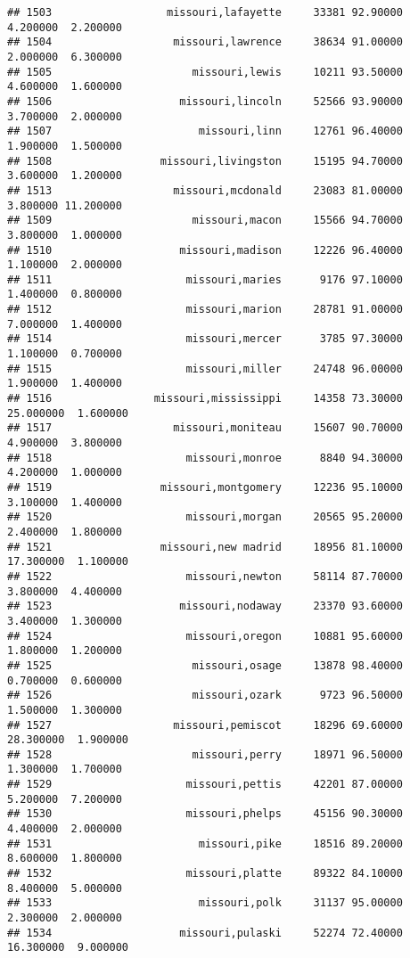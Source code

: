 \documentclass[
]{article}
\begin{document}
\begin{verbatim}
## 1503                  missouri,lafayette     33381 92.90000  4.200000  2.200000
## 1504                   missouri,lawrence     38634 91.00000  2.000000  6.300000
## 1505                      missouri,lewis     10211 93.50000  4.600000  1.600000
## 1506                    missouri,lincoln     52566 93.90000  3.700000  2.000000
## 1507                       missouri,linn     12761 96.40000  1.900000  1.500000
## 1508                 missouri,livingston     15195 94.70000  3.600000  1.200000
## 1513                   missouri,mcdonald     23083 81.00000  3.800000 11.200000
## 1509                      missouri,macon     15566 94.70000  3.800000  1.000000
## 1510                    missouri,madison     12226 96.40000  1.100000  2.000000
## 1511                     missouri,maries      9176 97.10000  1.400000  0.800000
## 1512                     missouri,marion     28781 91.00000  7.000000  1.400000
## 1514                     missouri,mercer      3785 97.30000  1.100000  0.700000
## 1515                     missouri,miller     24748 96.00000  1.900000  1.400000
## 1516                missouri,mississippi     14358 73.30000 25.000000  1.600000
## 1517                   missouri,moniteau     15607 90.70000  4.900000  3.800000
## 1518                     missouri,monroe      8840 94.30000  4.200000  1.000000
## 1519                 missouri,montgomery     12236 95.10000  3.100000  1.400000
## 1520                     missouri,morgan     20565 95.20000  2.400000  1.800000
## 1521                 missouri,new madrid     18956 81.10000 17.300000  1.100000
## 1522                     missouri,newton     58114 87.70000  3.800000  4.400000
## 1523                    missouri,nodaway     23370 93.60000  3.400000  1.300000
## 1524                     missouri,oregon     10881 95.60000  1.800000  1.200000
## 1525                      missouri,osage     13878 98.40000  0.700000  0.600000
## 1526                      missouri,ozark      9723 96.50000  1.500000  1.300000
## 1527                   missouri,pemiscot     18296 69.60000 28.300000  1.900000
## 1528                      missouri,perry     18971 96.50000  1.300000  1.700000
## 1529                     missouri,pettis     42201 87.00000  5.200000  7.200000
## 1530                     missouri,phelps     45156 90.30000  4.400000  2.000000
## 1531                       missouri,pike     18516 89.20000  8.600000  1.800000
## 1532                     missouri,platte     89322 84.10000  8.400000  5.000000
## 1533                       missouri,polk     31137 95.00000  2.300000  2.000000
## 1534                    missouri,pulaski     52274 72.40000 16.300000  9.000000

\end{verbatim}
\end{document}
